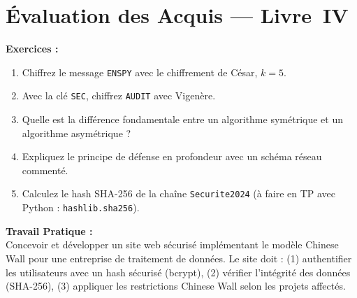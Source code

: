 \section{Évaluation des Acquis --- Livre~IV}

\begin{boxexo}
\textbf{Exercices :}
\begin{enumerate}
    \item Chiffrez le message \texttt{ENSPY} avec le chiffrement de César, $k=5$.
    \item Avec la clé \texttt{SEC}, chiffrez \texttt{AUDIT} avec Vigenère.
    \item Quelle est la différence fondamentale entre un algorithme symétrique et un algorithme asymétrique ?
    \item Expliquez le principe de défense en profondeur avec un schéma réseau commenté.
    \item Calculez le hash SHA-256 de la chaîne \texttt{Securite2024} (à faire en TP avec Python : \texttt{hashlib.sha256}).
\end{enumerate}

\textbf{Travail Pratique :}\\
Concevoir et développer un site web sécurisé implémentant le modèle Chinese Wall pour une entreprise de traitement de données. Le site doit : (1) authentifier les utilisateurs avec un hash sécurisé (bcrypt), (2) vérifier l'intégrité des données (SHA-256), (3) appliquer les restrictions Chinese Wall selon les projets affectés.
\end{boxexo}
